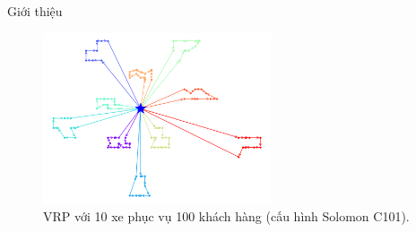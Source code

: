
\begin{frame}{Giới thiệu}
    \begin{figure}[H] %
        \centering %
        \includegraphics[width=0.6\textwidth]{figures/routes_c101.png} 
        \caption{VRP với 10 xe phục vụ 100 khách hàng (cấu hình Solomon C101).} 
    \end{figure}
\end{frame}